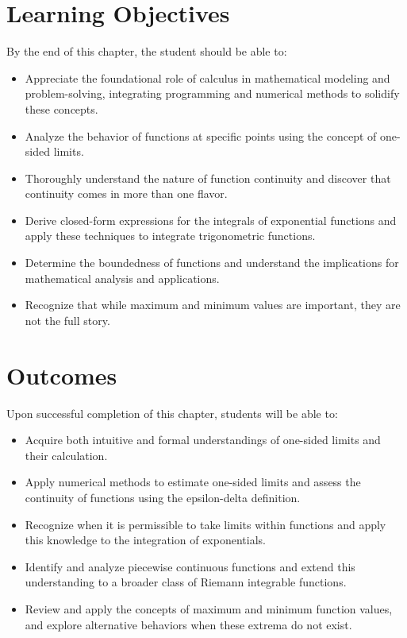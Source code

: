 \documentclass[letterpaper]{book}
\begin{document}
\begin{enumerate}[label={\large\arabic*}, font=\large]
\section*{Learning Objectives}By the end of this chapter, the student should be able to:
\begin{itemize}
\item Appreciate the foundational role of calculus in mathematical modeling and problem-solving, integrating programming and numerical methods to solidify these concepts.
\item Analyze the behavior of functions at specific points using the concept of one-sided limits.
\item Thoroughly understand the nature of function continuity and discover that continuity comes in more than one flavor.
\item Derive closed-form expressions for the integrals of exponential functions and apply these techniques to integrate trigonometric functions.
\item Determine the boundedness of functions and understand the implications for mathematical analysis and applications.
\item Recognize that while maximum and minimum values are important, they are not the full story.
\end{itemize}

\section*{Outcomes}
Upon successful completion of this chapter, students will be able to:
\begin{itemize}
\item Acquire both intuitive and formal understandings of one-sided limits and their calculation.
\item Apply numerical methods to estimate one-sided limits and assess the continuity of functions using the epsilon-delta definition.
\item Recognize when it is permissible to take limits within functions and apply this knowledge to the integration of exponentials.
\item Identify and analyze piecewise continuous functions and extend this understanding to a broader class of Riemann integrable functions.
\item Review and apply the concepts of maximum and minimum function values, and explore alternative behaviors when these extrema do not exist.
\end{itemize}


\end{enumerate}
\end{document}
